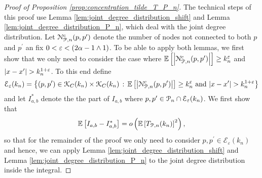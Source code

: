 \begin{proof}[Proof of Proposition \ref{prop:concentration_tilde_T_P_n}]


The technical steps of this proof use Lemma \ref{lem:joint_degree_distribution_shift} and Lemma \ref{lem:joint_degree_distribution_P_n}, which deal with the joint degree distribution. Let ${\mathcal N}_{{\mathcal P},n}^c(p,p^\prime)$ denote the number of nodes not connected to both $p$ and $p^\prime$ an fix $0 < \varepsilon < (2\alpha - 1 \wedge 1)$. To be able to apply both lemmas, we first show that we only need to consider the case where $\mathbb{E}\left[\left|{\mathcal N}_{{\mathcal P},n}^c(p,p^\prime)\right|\right] \ge k_n^{\varepsilon}$ and $|x - x^\prime| > k_n^{1+\varepsilon}$. To this end define 
\[
	\mathcal{E}_{\varepsilon}(k_n) = \left\{(p,p^\prime) \in {\mathcal K}_C(k_n) \times {\mathcal K}_C(k_n) 
	\, : \, \mathbb{E}\left[\left|{\mathcal N}_{{\mathcal P},n}^c(p,p^\prime)\right|\right] \ge k_n^{\varepsilon} \text{ and } |x - x^\prime| > k_n^{1 + \varepsilon} \right\}
\]
and let $I_{a,b}^\ast$ denote the the part of $I_{a,b}$ where $p,p^\prime \in {\mathcal P}_n \cap \mathcal{E}_\varepsilon(k_n)$. We first show that
\begin{eqnarray}\label{eq:I_ab_ast_main}
	\mathbb{E}\left[I_{a,b} - I_{a,b}^\ast\right] = o\left(\mathbb{E}\left[T_{{\mathcal P},n}(k_n)\right]^2\right),
\end{eqnarray}
so that for the remainder of the proof we only need to consider $p, p^\prime \in \mathcal{E}_\varepsilon(k_n)$ and hence, we can apply Lemma \ref{lem:joint_degree_distribution_shift} and Lemma \ref{lem:joint_degree_distribution_P_n} to the joint degree distribution inside the integral.


\end{proof}
